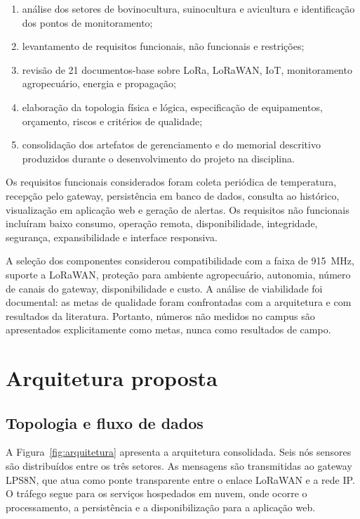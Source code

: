\documentclass[10pt,a4paper,twocolumn]{article}
\begin{document}
\begin{enumerate}
  \item análise dos setores de bovinocultura, suinocultura e avicultura e
  identificação dos pontos de monitoramento;
  \item levantamento de requisitos funcionais, não funcionais e restrições;
  \item revisão de 21 documentos-base sobre LoRa, LoRaWAN, IoT, monitoramento
  agropecuário, energia e propagação;
  \item elaboração da topologia física e lógica, especificação de equipamentos,
  orçamento, riscos e critérios de qualidade;
  \item consolidação dos artefatos de gerenciamento e do memorial descritivo
  produzidos durante o desenvolvimento do projeto na disciplina.
\end{enumerate}

Os requisitos funcionais considerados foram coleta periódica de temperatura,
recepção pelo gateway, persistência em banco de dados, consulta ao histórico,
visualização em aplicação web e geração de alertas. Os requisitos não funcionais
incluíram baixo consumo, operação remota, disponibilidade, integridade,
segurança, expansibilidade e interface responsiva.

A seleção dos componentes considerou compatibilidade com a faixa de
\SI{915}{\mega\hertz}, suporte a LoRaWAN, proteção para ambiente agropecuário,
autonomia, número de canais do gateway, disponibilidade e custo. A análise de
viabilidade foi documental: as metas de qualidade foram confrontadas com a
arquitetura e com resultados da literatura. Portanto, números não medidos no
campus são apresentados explicitamente como metas, nunca como resultados de
campo.

\section{Arquitetura proposta}

\subsection{Topologia e fluxo de dados}

A Figura~\ref{fig:arquitetura} apresenta a arquitetura consolidada. Seis nós
sensores são distribuídos entre os três setores. As mensagens são transmitidas ao
gateway LPS8N, que atua como ponte transparente entre o enlace LoRaWAN e a rede
IP. O tráfego segue para os serviços hospedados em nuvem, onde ocorre o
processamento, a persistência e a disponibilização para a aplicação web.
\end{document}
